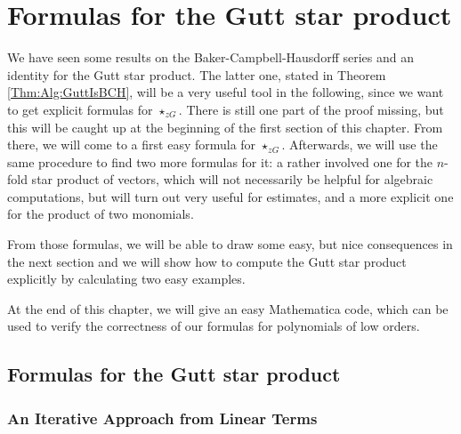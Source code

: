 
%
%

\chapter{Formulas for the Gutt star product}

We have seen some results on the Baker-Campbell-Hausdorff series and an 
identity for the Gutt star product. The latter one, stated in Theorem 
\ref{Thm:Alg:GuttIsBCH}, will be a very useful tool in the following, since 
we want to get explicit formulas for $\star_{zG}$. There is still one part of 
the proof missing, but this will be caught up at the beginning of the first 
section of this chapter. From there, we will come to a first easy formula for 
$\star_{zG}$. Afterwards, we will use the same procedure to find two more 
formulas for it: a rather involved one for the $n$-fold star product of 
vectors, which will not necessarily be helpful for algebraic computations, 
but will turn out very useful for estimates, and a more explicit one for the 
product of two monomials.

From those formulas, we will be able to draw some easy, but nice 
consequences in the next section and we will show how to compute the 
Gutt star product explicitly by calculating two easy examples.

At the end of this chapter, we will give an easy Mathematica code, which 
can be used to verify the correctness of our formulas for polynomials of low orders.



\section{Formulas for the Gutt star product}
\label{sec:chap4_Formulas}


%
%

\subsection{An Iterative Approach from Linear Terms}

